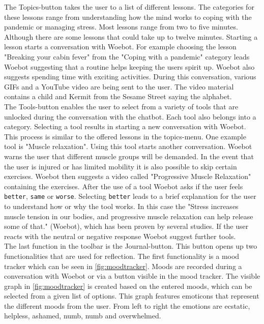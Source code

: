The Topics-button takes the user to a list of different lessons.
The categories for these lessons range from understanding how the mind works to coping with the pandemic or managing stress.
Most lessons range from two to five minutes.
Although there are some lessons that could take up to twelve minutes.
Starting a lesson starts a conversation with Woebot.
For example choosing the lesson "Breaking your cabin fever" from the "Coping with a pandemic" category leads Woebot suggesting that a routine helps keeping the users spirit up.
Woebot also suggests spending time with exciting activities.
During this conversation, various GIFs and a YouTube video are being sent to the user.
The video material contains a child and Kermit from the Sesame Street saying the alphabet. \\

The Tools-button enables the user to select from a variety of tools that are unlocked during the conversation with the chatbot.
Each tool also belongs into a category.
Selecting a tool results in starting a new conversation with Woebot.
This process is similar to the offered lessons in the topics-menu. One example tool is "Muscle relaxation".
Using this tool starts another conversation. Woebot warns the user that different muscle groups will be demanded.
In the event that the user is injured or has limited mobility it is also possible to skip certain exercises.
Woebot then suggests a video called "Progressive Muscle Relaxation" containing the exercises.
After the use of a tool Woebot asks if the user feels \texttt{better}, \texttt{same} or \texttt{worse}.
Selecting \texttt{better} leads to a brief explanation for the user to understand how or why the tool works.
In this case the "Stress increases muscle tension in our bodies, and progressive muscle relaxation can help release some of that." (Woebot), which has been proven by several studies\cite{progressive-muscle, stress-pmr}.
If the user reacts with the neutral or negative response Woebot suggest further tools.\\

The last function in the toolbar is the Journal-button.
This button opens up two functionalities that are used for reflection.
The first functionality is a mood tracker which can be seen in \autoref{fig:moodtracker}.
Moods are recorded during a conversation with Woebot or via a button visible in the mood tracker.
The visible graph in \autoref{fig:moodtracker} is created based on the entered moods, which can be selected from a given list of options.
This graph features emoticons that represent the different moods from the user. 
From left to right the emotions are ecstatic, helpless, ashamed, numb, numb and overwhelmed.\\

